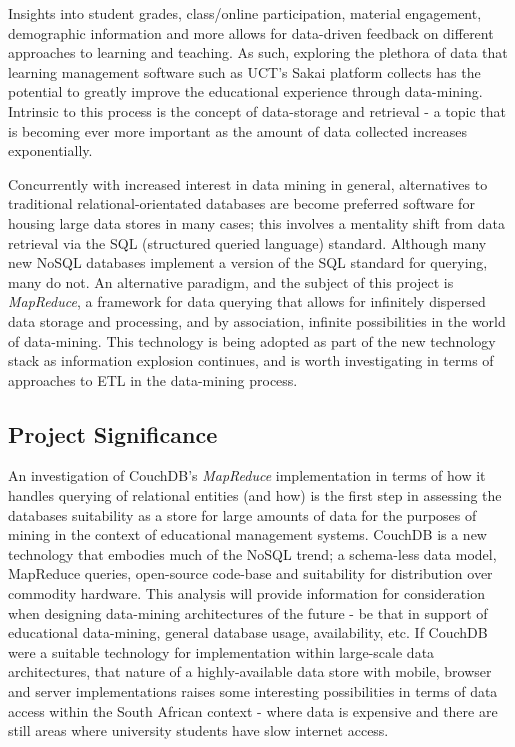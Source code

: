 Insights into student grades, class/online participation, material engagement, demographic information and more allows for data-driven feedback on different approaches to learning and teaching. As such, exploring the plethora of data that learning management software such as UCT's Sakai platform collects has the potential to greatly improve the educational experience through data-mining. Intrinsic to this process is the concept of data-storage and retrieval - a topic that is becoming ever more important as the amount of data collected increases exponentially.

Concurrently with increased interest in data mining in general, alternatives to traditional relational-orientated databases are become preferred software for housing large data stores in many cases; this involves a mentality shift from data retrieval via the SQL (structured queried language) standard. Although many new NoSQL databases implement a version of the SQL standard for querying, many do not. An alternative paradigm, and the subject of this project is \textit{MapReduce}, a framework for data querying that allows for infinitely dispersed data storage and processing, and by association, infinite possibilities in the world of data-mining. This technology is being adopted as part of the new technology stack as information explosion continues, and is worth investigating in terms of approaches to ETL in the data-mining process.

\subsection{Project Significance}
An investigation of CouchDB's \textit{MapReduce} implementation in terms of how it handles querying of relational entities (and how) is the first step in assessing the databases suitability as a store for large amounts of data for the purposes of mining in the context of educational management systems. CouchDB is a new technology that embodies much of the NoSQL trend; a schema-less data model, MapReduce queries, open-source code-base and suitability for distribution over commodity hardware. This analysis will provide information for consideration when designing data-mining architectures of the future - be that in support of educational data-mining, general database usage, availability, etc. If CouchDB were a suitable technology for implementation within large-scale data architectures, that nature of a highly-available data store with mobile, browser and server implementations raises some interesting possibilities in terms of data access within the South African context - where data is expensive and there are still areas where university students have slow internet access.